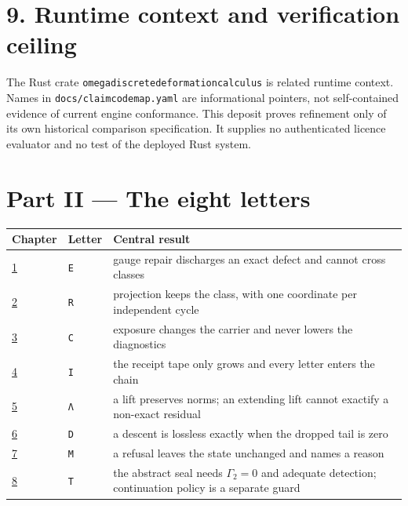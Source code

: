 \documentclass[
  11pt,
]{article}
\renewcommand{\_}{\ddcunderscore\allowbreak}
\begin{document}
\section{9. Runtime context and verification
ceiling}\label{runtime-context-and-verification-ceiling}

The Rust crate \texttt{omega\_discrete\_deformation\_calculus} is
related runtime context. Names in \texttt{docs/\allowbreak claim\_code\_map.\allowbreak yaml}
are informational pointers, not self-contained evidence of current
engine conformance. This deposit proves refinement only of its own
historical comparison specification. It supplies no authenticated
licence evaluator and no test of the deployed Rust system.

\section{Part II --- The eight letters}\label{part-ii-the-eight-letters}

\begin{longtable}[]{@{}
  >{\raggedright\arraybackslash}p{}
  >{\raggedright\arraybackslash}p{}
  >{\raggedright\arraybackslash}p{}@{}}
\toprule\noalign{}
\begin{minipage}[b]{\linewidth}\raggedright
Chapter
\end{minipage} & \begin{minipage}[b]{\linewidth}\raggedright
Letter
\end{minipage} & \begin{minipage}[b]{\linewidth}\raggedright
Central result
\end{minipage} \\
\midrule\noalign{}
\endhead
\bottomrule\noalign{}
\endlastfoot
\hyperref[chapter-1]{1} & \texttt{E} & gauge repair discharges an exact
defect and cannot cross classes \\
\hyperref[chapter-2]{2} & \texttt{R} & projection keeps the class, with
one coordinate per independent cycle \\
\hyperref[chapter-3]{3} & \texttt{C} & exposure changes the carrier and
never lowers the diagnostics \\
\hyperref[chapter-4]{4} & \texttt{I} & the receipt tape only grows and
every letter enters the chain \\
\hyperref[chapter-5]{5} & \texttt{Λ} & a lift preserves norms; an
extending lift cannot exactify a non-exact residual \\
\hyperref[chapter-6]{6} & \texttt{D} & a descent is lossless exactly
when the dropped tail is zero \\
\hyperref[chapter-7]{7} & \texttt{M} & a refusal leaves the state
unchanged and names a reason \\
\hyperref[chapter-8]{8} & \texttt{T} & the abstract seal needs
\(\Gamma_2 = 0\) and adequate detection; continuation policy is a
separate guard \\
\end{longtable}
\end{document}
